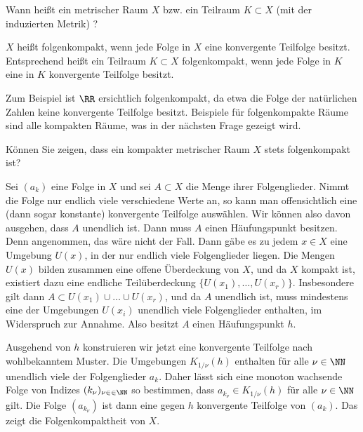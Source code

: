 \begin{frage}
  Wann heißt ein metrischer Raum $X$ bzw. ein Teilraum 
  $K\subset X$ (mit der induzierten 
  Metrik) ?
\end{frage}

\begin{antwort}
  $X$ heißt folgenkompakt, wenn jede Folge in $X$ eine konvergente 
  Teilfolge besitzt. 
  Entsprechend heißt ein Teilraum $K\subset X$ folgenkompakt, 
  wenn jede Folge in $K$ eine in $K$ konvergente Teilfolge besitzt. 

  Zum Beispiel ist $\RR$ ersichtlich  folgenkompakt, 
  da etwa die Folge der natürlichen Zahlen keine konvergente Teilfolge 
  besitzt.  
  Beispiele für folgenkompakte Räume sind alle kompakten 
   Räume, was in der 
  nächsten Frage gezeigt wird.
  \AntEnd 
\end{antwort}

\begin{frage}\label{09_kompfolgkomp}
  Können Sie zeigen, dass 
  ein kompakter metrischer Raum $X$ stets folgenkompakt ist?
\end{frage}

\begin{antwort}
  Sei $(a_k)$ eine Folge in $X$ und sei $A\subset X$ die Menge 
  ihrer Folgenglieder. Nimmt die Folge nur endlich 
  viele verschiedene Werte an, so kann man offensichtlich eine (dann sogar 
  konstante) konvergente Teilfolge auswählen. Wir können also davon 
  ausgehen, dass $A$ unendlich ist. Dann muss $A$ einen Häufungspunkt 
  besitzen. Denn angenommen, das wäre nicht der Fall. Dann gäbe es zu jedem 
  $x\in X$ eine Umgebung $U(x)$, in der nur endlich viele Folgenglieder 
  liegen. Die Mengen $U(x)$ bilden zusammen eine offene Überdeckung von 
  $X$, und da $X$ kompakt ist, existiert dazu eine endliche Teilüberdeckung 
  $\{ U(x_1), \ldots ,U(x_r) \}$. Insbesondere gilt dann 
  $A\subset U(x_1)\cup \ldots  \cup U(x_r)$, und da $A$ unendlich ist, 
  muss mindestens eine der Umgebungen $U(x_i)$ unendlich viele 
  Folgenglieder enthalten, im Widerspruch zur Annahme. Also besitzt 
  $A$ einen Häufungspunkt $h$. 
  
  Ausgehend von $h$ konstruieren wir jetzt eine konvergente Teilfolge 
  nach wohlbekanntem Muster. Die 
  Umgebungen $K_{1/\nu} (h)$ enthalten für alle $\nu\in \NN$ unendlich viele 
  der Folgenglieder $a_k$. Daher lässt sich eine monoton wachsende Folge von 
  Indizes $(k_\nu)_{\nu\in \in \NN}$ so bestimmen, dass 
  $a_{k_\nu} \in K_{1/\nu}(h)$ für alle $\nu\in \NN$ gilt. 
  Die Folge $(a_{k_\nu})$ ist dann eine gegen $h$ konvergente  
  Teilfolge von $(a_k)$. Das zeigt die Folgenkompaktheit von $X$.  \AntEnd
\end{antwort}

